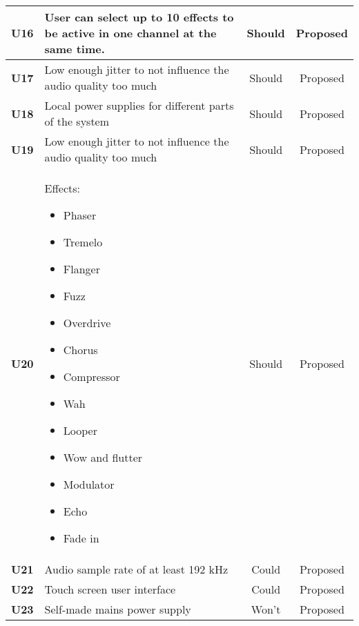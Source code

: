 \begin{longtable}{|c|p{10cm}|c|c|}
		\textbf{U16} & User can select up to 10 effects to be active in one channel at the same time. 								& Should & Proposed\\ \hline
		\textbf{U17} & Low enough jitter to not influence the audio quality too much 												& Should & Proposed\\ \hline
		\textbf{U18} & Local power supplies for different parts of the system 														& Should & Proposed\\ \hline
		\textbf{U19} & Low enough jitter to not influence the audio quality too much 												& Should & Proposed\\ \hline
		\textbf{U20} & Effects:\newline
		\begin{itemize}
			\setlength\itemsep{-0.3em}
			\item Phaser
			\item Tremelo
			\item Flanger
			\item Fuzz
			\item Overdrive
			\item Chorus
			\item Compressor
			\item Wah
			\item Looper
			\item Wow and flutter
			\item Modulator
			\item Echo
			\item Fade in
		\end{itemize}																												& Should & Proposed\\ \hline
		\textbf{U21} & Audio sample rate of at least 192 kHz 																		& Could  & Proposed\\ \hline
		\textbf{U22} & Touch screen user interface 																					& Could  & Proposed\\ \hline
		\textbf{U23} & Self-made mains power supply  																				& Won't  & Proposed\\ \hline
	\end{longtable}